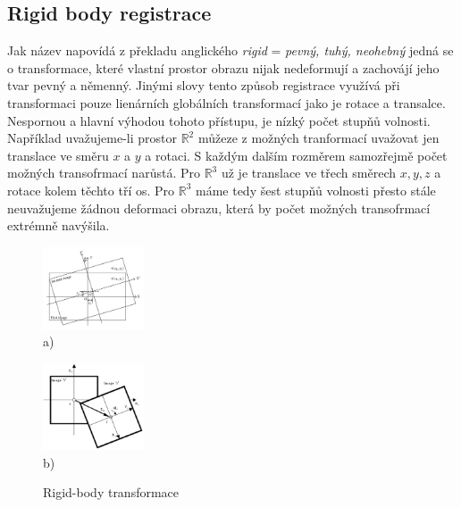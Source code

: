 \documentclass{thesis}%
\begin{document}
\subsection{Rigid body registrace}
Jak název napovídá z překladu anglického \textit{rigid} = \textit{pevný, tuhý, neohebný} jedná se o transformace, které vlastní prostor obrazu nijak nedeformují a zachovájí jeho tvar pevný a němenný. Jinými slovy tento způsob registrace využívá při transformaci pouze lienárních globálních transformací jako je rotace a transalce.\\
Nespornou a hlavní výhodou tohoto přístupu, je nízký počet stupňů volnosti. Například uvažujeme-li prostor $\mathbb{R}^{2}$ můžeze z možných tranformací uvažovat jen translace ve směru $x$ a $y$ a rotaci. S každým dalším rozměrem samozřejmě počet možných transofrmací narůstá. Pro $\mathbb{R}^{3}$ už je translace ve třech směrech $x,y,z$ a rotace kolem těchto tří os. Pro $\mathbb{R}^{3}$ máme tedy šest stupňů volnosti přesto stále neuvažujeme žádnou deformaci obrazu, která by počet možných transofrmací extrémně navýšila. 
 \begin{figure}[htp!]
  \centering
   \begin{minipage}[c]{0.3\textwidth}
     \centering\includegraphics[width=3cm]{Rigid-body-transformation-scale-1.png}\\
     a)
   \end{minipage}
    \begin{minipage}[c]{0.3\textwidth}
     \centering\includegraphics[width=3cm]{rigid2.png}\\
      b)
   \end{minipage}
	\caption[Rigid-body transformace]{Rigid-body transformace}
\end{figure}
\end{document}

